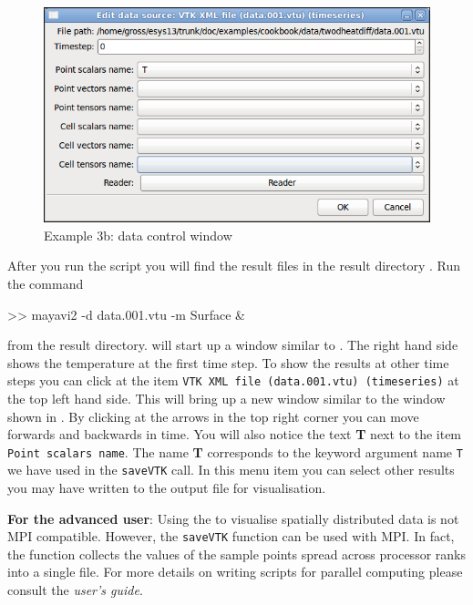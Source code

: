 \begin{figure}[ht]
\centerline{\includegraphics[width=4.in]{figures/ScreeshotMayavi2n2}}
\caption{Example 3b: \mayavi data control window}
\label{fig:mayavi window2}
\end{figure}
After you run the script you will find the 
result files  in the result directory .
Run the command
\begin{python}
>> mayavi2 -d data.001.vtu -m Surface &
\end{python}
from the result directory. \mayavi will start up a window similar to
.
The right hand side shows the temperature at the first time step. To show
the results at other time steps you can click at the item \texttt{VTK XML file
(data.001.vtu) (timeseries)}
at the top left hand side. This will bring up a new window similar to the window
shown in . By clicking at the arrows in the top
right corner you can move forwards and backwards in time. 
You will also notice the text \textbf{T} next to the item \texttt{Point scalars
name}. The
name \textbf{T} corresponds to the keyword argument name \texttt{T} we have
used in the \verb|saveVTK| call. In this menu item you can select other results
you may have written to the output file for visualisation.

\textbf{For the advanced user}: Using the \modmpl to visualise spatially
distributed data is not MPI compatible. However, the \verb|saveVTK| function
can be used with MPI. In fact, the function collects the values of the sample
points spread across processor ranks into a single file.
For more details on writing scripts for parallel computing please consult the
\emph{user's guide}.

